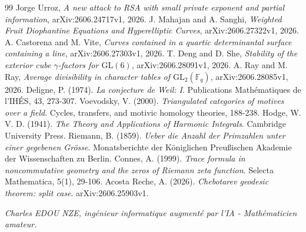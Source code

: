 \documentclass[
]{article}
\begin{document}
\begin{thebibliography}{99}
 Jorge Urroz, \textit{A new attack to RSA with small private exponent and partial information}, arXiv:2606.24717v1, 2026.
 J. Mahajan and A. Sanghi, \textit{Weighted Fruit Diophantine Equations and Hyperelliptic Curves}, arXiv:2606.27322v1, 2026.
 A. Castorena and M. Vite, \textit{Curves contained in a quartic determinantal surface containing a line}, arXiv:2606.27303v1, 2026.
 T. Deng and D. She, \textit{Stability of the exterior cube $\gamma$-factors for $\mathrm{GL}(6)$}, arXiv:2606.28091v1, 2026.
 A. Ray and M. Ray, \textit{Average divisibility in character tables of $\mathrm{GL}_2(\mathbb{F}_q)$}, arXiv:2606.28085v1, 2026.
 Deligne, P. (1974). \textit{La conjecture de Weil: I}. Publications Mathématiques de l'IHÉS, 43, 273-307.
 Voevodsky, V. (2000). \textit{Triangulated categories of motives over a field}. Cycles, transfers, and motivic homology theories, 188-238.
 Hodge, W. V. D. (1941). \textit{The Theory and Applications of Harmonic Integrals}. Cambridge University Press.
 Riemann, B. (1859). \textit{Ueber die Anzahl der Primzahlen unter einer gegebenen Grösse}. Monatsberichte der Königlichen Preußischen Akademie der Wissenschaften zu Berlin.
 Connes, A. (1999). \textit{Trace formula in noncommutative geometry and the zeros of Riemann zeta function}. Selecta Mathematica, 5(1), 29-106.
 Acosta Reche, A. (2026). \textit{Chebotarev geodesic theorem: split case}. arXiv:2606.25903v1.
\end{thebibliography}

\vspace{1cm}
\begin{flushright}
\textit{Charles EDOU NZE, ingénieur informatique augmenté par l'IA - Mathématicien amateur.}
\end{flushright}
\end{document}
